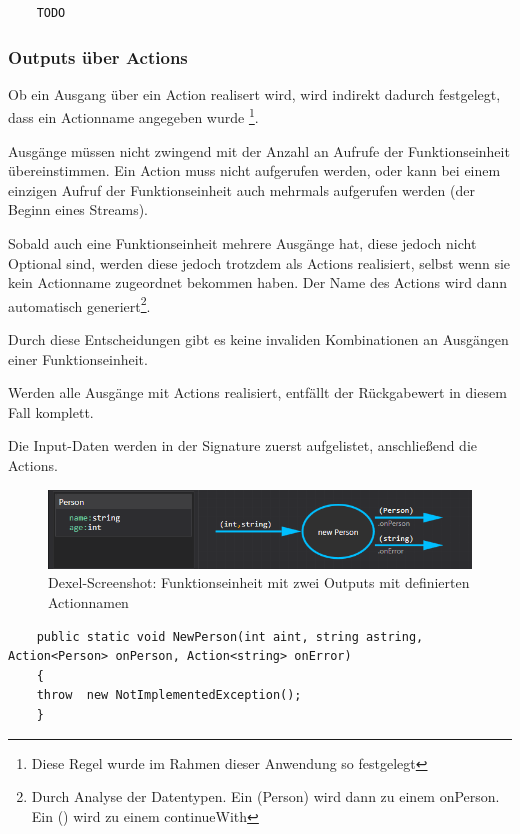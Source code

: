 	
	
	\begin{verbatim}
	TODO
	\end{verbatim}
	
\subsubsection{Outputs über Actions}

	Ob ein Ausgang über ein Action realisert wird, wird indirekt dadurch
	festgelegt, dass ein Actionname angegeben wurde \footnote{Diese Regel wurde im
		Rahmen dieser Anwendung so festgelegt}. 
	
	Ausgänge müssen nicht zwingend mit
	der Anzahl an Aufrufe der Funktionseinheit übereinstimmen. Ein Action muss
	nicht aufgerufen werden, oder kann bei einem einzigen Aufruf der Funktionseinheit auch
	mehrmals aufgerufen werden (der Beginn eines Streams). 
	
	Sobald auch eine Funktionseinheit mehrere Ausgänge hat, diese jedoch nicht
	Optional sind, werden diese jedoch trotzdem als Actions realisiert, selbst wenn sie kein
	Actionname zugeordnet bekommen haben. Der Name des Actions wird dann
	automatisch generiert\footnote{	Durch Analyse der Datentypen. Ein
	(Person) wird dann zu einem onPerson. Ein () wird zu einem continueWith}.
	
	Durch diese Entscheidungen gibt es keine invaliden Kombinationen an
	Ausgängen einer Funktionseinheit.
	
	
	Werden alle Ausgänge mit Actions realisiert, entfällt der Rückgabewert in diesem Fall komplett.
	
	Die Input-Daten werden in der Signature zuerst aufgelistet, anschließend die Actions.
	
			\begin{figure}[!htbp]
				\centering
				\includegraphics[width=\linewidth]{./img/roslyn_multipleOutputs.png} 
				\caption{Dexel-Screenshot: Funktionseinheit mit zwei Outputs mit definierten Actionnamen}
			\end{figure}
			
	

	
	\begin{verbatim}
	public static void NewPerson(int aint, string astring, Action<Person> onPerson, Action<string> onError)
	{
	throw  new NotImplementedException();
	}
	\end{verbatim}
